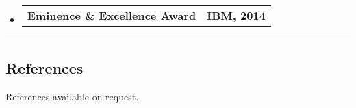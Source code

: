 \documentclass[10pt,letterpaper]{article}
\makeatletter
\newcommand{\headerrow}[2]
{\begin{tabular*}{\linewidth}{l@{\extracolsep{\fill}}r}
    #1 &
    #2 \\
\end{tabular*}}
\makeatother
\begin{document}
\begin{itemize}
    \parskip=0.1em
    \item
    \headerrow
        {\textbf{Eminence \& Excellence Award}}
        {\textbf{IBM, 2014}}

\end{itemize}

\hrule
\vspace{-0.4em}
\subsection*{References}

References available on request.
\end{document}
